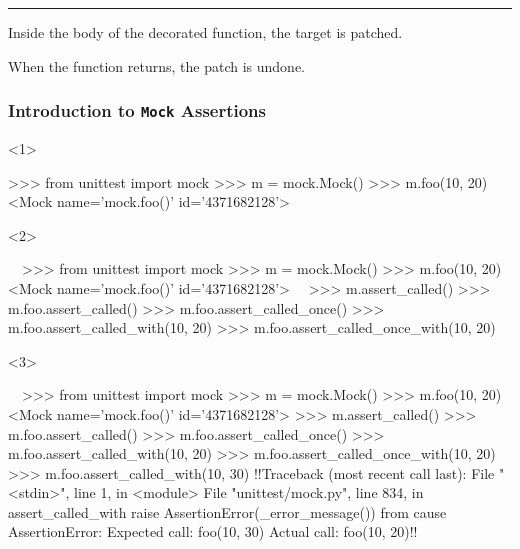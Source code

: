 \documentclass[xcolor={svgnames}]{beamer}
\newcommand{\ttcode}[2][]{\lstinline[style=plain,basicstyle=\ttfamily#1]{#2}}
\newcommand{\hr}[2]{\vspace{#1}\hrule height 0.01mm\vspace{#2}}
\begin{document}
\begin{frame}[t,fragile]
\begin{onlyenv}
        \hr{1mm}{1mm}

        Inside the body of the decorated function, the target is
        patched.

        When the function returns, the patch is undone.
    \end{onlyenv}
\end{frame}


\begin{frame}[t,fragile]
    \frametitle{Introduction to \ttcode{Mock} Assertions}
    \begin{onlyenv}<1>
        \begin{pyenv}[gobble=12]
            >>> from unittest import mock
            >>> m = mock.Mock()
            >>> m.foo(10, 20)
            <Mock name='mock.foo()' id='4371682128'>
        \end{pyenv}
    \end{onlyenv}
    \begin{onlyenv}<2>
        \begin{pyenv}[gobble=12]
            ~~>>> from unittest import mock
            >>> m = mock.Mock()
            >>> m.foo(10, 20)
            <Mock name='mock.foo()' id='4371682128'>~~
            >>> m.assert_called()
            >>> m.foo.assert_called()
            >>> m.foo.assert_called_once()
            >>> m.foo.assert_called_with(10, 20)
            >>> m.foo.assert_called_once_with(10, 20)
        \end{pyenv}
    \end{onlyenv}
    \begin{onlyenv}<3>
        \begin{pyenv}[gobble=12]
            ~~>>> from unittest import mock
            >>> m = mock.Mock()
            >>> m.foo(10, 20)
            <Mock name='mock.foo()' id='4371682128'>
            >>> m.assert_called()
            >>> m.foo.assert_called()
            >>> m.foo.assert_called_once()
            >>> m.foo.assert_called_with(10, 20)
            >>> m.foo.assert_called_once_with(10, 20)~~
            >>> m.foo.assert_called_with(10, 30)
            !!Traceback (most recent call last):
              File "<stdin>", line 1, in <module>
              File "unittest/mock.py", line 834, in assert_called_with
                raise AssertionError(_error_message()) from cause
            AssertionError: Expected call: foo(10, 30)
            Actual call: foo(10, 20)!!
        \end{pyenv}
    \end{onlyenv}

\end{frame}
\end{document}
